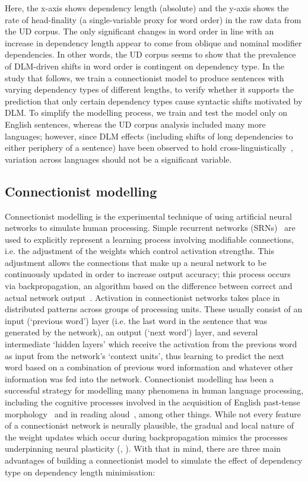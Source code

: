 \documentclass{article}
\begin{document}
Here, the x-axis shows dependency length (absolute) and the y-axis shows the rate of head-finality (a single-variable proxy for word order) in the raw data from the UD corpus. The only significant changes in word order in line with an increase in dependency length appear to come from oblique and nominal modifier dependencies. In other words, the UD corpus seems to show that the prevalence of DLM-driven shifts in word order is contingent on dependency type. In the study that follows, we train a connectionist model to produce sentences with varying dependency types of different lengths, to verify whether it supports the prediction that only certain dependency types cause syntactic shifts motivated by DLM. To simplify the modelling process, we train and test the model only on English sentences, whereas the UD corpus analysis included many more languages; however, since DLM effects (including shifts of long dependencies to either periphery of a sentence) have been observed to hold cross-linguistically~\cite{chang2009}, variation across languages should not be a significant variable.


\subsection{Connectionist modelling}
Connectionist modelling is the experimental technique of using artificial neural networks to simulate human processing. Simple recurrent networks (SRNs)~\cite{elman1990} are used to explicitly represent a learning process involving modifiable connections, i.e. the adjustment of the weights which control activation strengths. This adjustment allows the connections that make up a neural network to be continuously updated in order to increase output accuracy; this process occurs via backpropagation, an algorithm based on the difference between correct and actual network output~\cite{rumelhart1986}. Activation in connectionist networks takes place in distributed patterns across groups of processing units. These usually consist of an input (`previous word') layer (i.e. the last word in the sentence that was generated by the network), an output (`next word') layer, and several intermediate `hidden layers' which receive the activation from the previous word as input from the network's `context units', thus learning to predict the next word based on a combination of previous word information and whatever other information was fed into the network. Connectionist modelling has been a successful strategy for modelling many phenomena in human language processing, including the cognitive processes involved in the acquisition of English past-tense morphology~\cite{rumelhart1988} and in reading aloud~\cite{plaut1999}, among other things.
While not every feature of a connectionist network is neurally plausible, the gradual and local nature of the weight updates which occur during backpropagation mimics the processes underpinning neural plasticity (\cite{chang2014}, \cite{klintsova1999}). With that in mind, there are three main advantages of building a connectionist model to simulate the effect of dependency type on dependency length minimisation:
\end{document}
